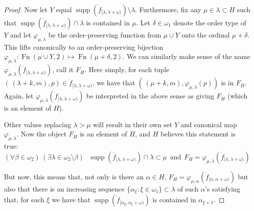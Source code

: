 \documentclass{rmmcart}
\theoremstyle{plain}
\theoremstyle{definition}
\theoremstyle{remark}
\theoremstyle{plain}
\theoremstyle{definition}
\theoremstyle{remark}
\begin{document}
\begin{proof}
             Now let $Y$ equal $\operatorname{supp}(\dot
             f_{[\lambda,\lambda+\omega)})\setminus \lambda$. Furthermore,
             fix any $\mu\in \lambda\subset H$ such that
               $\operatorname{supp}(\dot
             f_{[\lambda,\lambda+\omega)})\cap \lambda$ is contained in $\mu$.
             Let $\delta\in \omega_1$ denote the order type of
             $Y$ and let  $\varphi_{\mu,\lambda}$ be the order-preserving function
             from  $\mu\cup Y$ onto  the ordinal $\mu+\delta$.  This lifts
             canonically to
            an order-preserving bijection $\varphi_{\mu,\lambda}:
            \operatorname{Fn}(\mu\cup Y,2) \mapsto
            \operatorname{Fn}(\mu+\delta,2)$.
            We can similarly make sense of the name
             $\varphi_{\mu,\lambda}(\dot f_{[\lambda,\lambda+\omega)})$, call it $F_H$.
            Here simply, for each tuple $(\,(\lambda+k,m), p)\in \dot
            f_{[\lambda,\lambda+\omega)}$,
             we have that $(\,(\mu+k,m),\varphi_{\mu,\lambda}(p))$ is in $F_H$.
            Again, let $\varphi_{\mu,\lambda}(\dot f_{[\lambda,\lambda+\omega)})$
            be interpreted in the above sense as giving $F_H$ (which is an element
            of $H$).


             Other values
            replacing $\lambda>\mu$ will result in their own set $Y$
            and canonical map $\varphi_{\mu,\lambda}$.
            Now the object $F_H$ is an
            element of $H$, and $H$ believes this statement is true:
            $$
            (\forall \beta\in\omega_2)~ (\exists \lambda\in \omega_2\setminus \beta)~~~
            \operatorname{supp}(\dot f_{[\lambda,\lambda+\omega)})
            \cap \lambda\subset \mu \ \ \mbox{and}\ \
            F_H = \varphi_{\mu,\lambda}(\dot f_{[\lambda,\lambda+\omega)})$$


            But now, this  means that,
            not only is there  an $\alpha\in H$,
            $ F_H = \varphi_{\mu,\alpha}(\dot f_{[\alpha,\alpha+\omega)})$
            but also that there is an increasing sequence
             $\{\alpha_\xi : \xi  \in \omega_1\}\subset \lambda$ of
             such $\alpha$'s satisfying that, for each $\xi$
            we have that $\operatorname{supp}(\dot
            f_{[\alpha_\xi,\alpha_\xi+\omega)})$ is contained in $\alpha_{\xi+1}$.


\end{proof}
\end{document}
